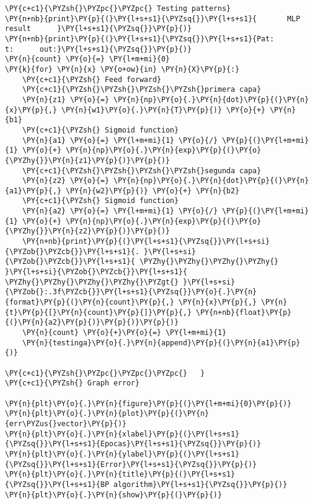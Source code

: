    \begin{tcolorbox}[breakable, size=fbox, boxrule=1pt, pad at break*=1mm,colback=cellbackground, colframe=cellborder]
\begin{Verbatim}[commandchars=\\\{\}]
\PY{c+c1}{\PYZsh{}\PYZpc{}\PYZpc{} Testing patterns}
\PY{n+nb}{print}\PY{p}{(}\PY{l+s+s1}{\PYZsq{}}\PY{l+s+s1}{       MLP result      }\PY{l+s+s1}{\PYZsq{}}\PY{p}{)}
\PY{n+nb}{print}\PY{p}{(}\PY{l+s+s1}{\PYZsq{}}\PY{l+s+s1}{Pat:          t:      out:}\PY{l+s+s1}{\PYZsq{}}\PY{p}{)}
\PY{n}{count} \PY{o}{=} \PY{l+m+mi}{0}
\PY{k}{for} \PY{n}{x} \PY{o+ow}{in} \PY{n}{X}\PY{p}{:}
    \PY{c+c1}{\PYZsh{} Feed forward}
    \PY{c+c1}{\PYZsh{}\PYZsh{}\PYZsh{}\PYZsh{}primera capa}
    \PY{n}{z1} \PY{o}{=} \PY{n}{np}\PY{o}{.}\PY{n}{dot}\PY{p}{(}\PY{n}{x}\PY{p}{,} \PY{n}{w1}\PY{o}{.}\PY{n}{T}\PY{p}{)} \PY{o}{+} \PY{n}{b1} 
    \PY{c+c1}{\PYZsh{} Sigmoid function}
    \PY{n}{a1} \PY{o}{=} \PY{l+m+mi}{1} \PY{o}{/} \PY{p}{(}\PY{l+m+mi}{1} \PY{o}{+} \PY{n}{np}\PY{o}{.}\PY{n}{exp}\PY{p}{(}\PY{o}{\PYZhy{}}\PY{n}{z1}\PY{p}{)}\PY{p}{)} 
    \PY{c+c1}{\PYZsh{}\PYZsh{}\PYZsh{}\PYZsh{}segunda capa}
    \PY{n}{z2} \PY{o}{=} \PY{n}{np}\PY{o}{.}\PY{n}{dot}\PY{p}{(}\PY{n}{a1}\PY{p}{,} \PY{n}{w2}\PY{p}{)} \PY{o}{+} \PY{n}{b2}
    \PY{c+c1}{\PYZsh{} Sigmoid function}
    \PY{n}{a2} \PY{o}{=} \PY{l+m+mi}{1} \PY{o}{/} \PY{p}{(}\PY{l+m+mi}{1} \PY{o}{+} \PY{n}{np}\PY{o}{.}\PY{n}{exp}\PY{p}{(}\PY{o}{\PYZhy{}}\PY{n}{z2}\PY{p}{)}\PY{p}{)}
    \PY{n+nb}{print}\PY{p}{(}\PY{l+s+s1}{\PYZsq{}}\PY{l+s+si}{\PYZob{}\PYZcb{}}\PY{l+s+s1}{. }\PY{l+s+si}{\PYZob{}\PYZcb{}}\PY{l+s+s1}{ \PYZhy{}\PYZhy{}\PYZhy{}\PYZhy{} }\PY{l+s+si}{\PYZob{}\PYZcb{}}\PY{l+s+s1}{ \PYZhy{}\PYZhy{}\PYZhy{}\PYZhy{}\PYZgt{} }\PY{l+s+si}{\PYZob{}:.3f\PYZcb{}}\PY{l+s+s1}{\PYZsq{}}\PY{o}{.}\PY{n}{format}\PY{p}{(}\PY{n}{count}\PY{p}{,} \PY{n}{x}\PY{p}{,} \PY{n}{t}\PY{p}{[}\PY{n}{count}\PY{p}{]}\PY{p}{,} \PY{n+nb}{float}\PY{p}{(}\PY{n}{a2}\PY{p}{)}\PY{p}{)}\PY{p}{)}
    \PY{n}{count} \PY{o}{+}\PY{o}{=} \PY{l+m+mi}{1}
    \PY{n}{testinga}\PY{o}{.}\PY{n}{append}\PY{p}{(}\PY{n}{a1}\PY{p}{)}
    
\PY{c+c1}{\PYZsh{}\PYZpc{}\PYZpc{}\PYZpc{}   }
\PY{c+c1}{\PYZsh{} Graph error}
 
\PY{n}{plt}\PY{o}{.}\PY{n}{figure}\PY{p}{(}\PY{l+m+mi}{0}\PY{p}{)}
\PY{n}{plt}\PY{o}{.}\PY{n}{plot}\PY{p}{(}\PY{n}{err\PYZus{}vector}\PY{p}{)}
\PY{n}{plt}\PY{o}{.}\PY{n}{xlabel}\PY{p}{(}\PY{l+s+s1}{\PYZsq{}}\PY{l+s+s1}{Epocas}\PY{l+s+s1}{\PYZsq{}}\PY{p}{)}
\PY{n}{plt}\PY{o}{.}\PY{n}{ylabel}\PY{p}{(}\PY{l+s+s1}{\PYZsq{}}\PY{l+s+s1}{Error}\PY{l+s+s1}{\PYZsq{}}\PY{p}{)}
\PY{n}{plt}\PY{o}{.}\PY{n}{title}\PY{p}{(}\PY{l+s+s1}{\PYZsq{}}\PY{l+s+s1}{BP algorithm}\PY{l+s+s1}{\PYZsq{}}\PY{p}{)}
\PY{n}{plt}\PY{o}{.}\PY{n}{show}\PY{p}{(}\PY{p}{)}
\end{Verbatim}
\end{tcolorbox}

